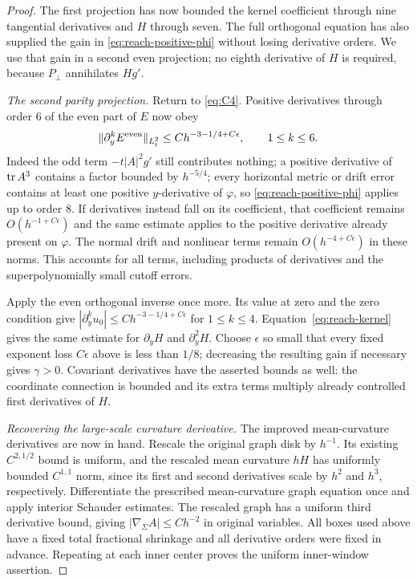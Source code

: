 \begin{proof}
The first projection has now bounded the kernel coefficient through
nine tangential derivatives and $H$ through seven.  The full orthogonal
equation has also supplied the gain in \eqref{eq:reach-positive-phi}
without losing derivative orders.  We use that gain in a second even
projection; no eighth derivative of $H$ is required, because $P_\perp$
annihilates $Hg'$.

\emph{The second parity projection.}
Return to \eqref{eq:C4}.  Positive derivatives through order 6 of
the even part of $E$ now obey
\begin{equation}\label{eq:reach-second-parity}
 \|\partial_y^kE^{\rm even}\|_{L_t^2}
 \le C h^{-3-1/4+C\epsilon},\qquad1\le k\le6.
\end{equation}
Indeed the odd term $-t|A|^2g'$ still contributes nothing; a positive
derivative of $\operatorname{tr} A^3$ contains a factor bounded by $h^{-5/4}$;
every horizontal metric or drift error contains at least one positive
$y$-derivative of $\varphi$, so \eqref{eq:reach-positive-phi} applies
up to order 8.  If derivatives instead fall on its coefficient, that
coefficient remains $O(h^{-1+C\epsilon})$ and the same estimate
applies to the positive derivative already present on $\varphi$.
The normal drift and nonlinear terms remain $O(h^{-4+C\epsilon})$
in these norms.  This accounts for all terms, including products of
derivatives and the superpolynomially small cutoff errors.

Apply the even orthogonal inverse once more.  Its value at zero and
the zero condition give
$|\partial_y^ku_0|\le C h^{-3-1/4+C\epsilon}$ for $1\le k\le4$.
Equation~\eqref{eq:reach-kernel} gives the same estimate for
$\partial_yH$ and $\partial_y^2H$.  Choose $\epsilon$ so small that
every fixed exponent loss $C\epsilon$ above is less than $1/8$;
decreasing the resulting gain if necessary gives $\gamma>0$.
Covariant derivatives have the asserted bounds as well: the coordinate
connection is bounded and its extra terms multiply already controlled
first derivatives of $H$.

\emph{Recovering the large-scale curvature derivative.}
The improved mean-curvature derivatives are now in hand.  Rescale
the original graph disk by $h^{-1}$.  Its existing
$C^{2,1/2}$ bound is uniform, and the rescaled mean curvature $hH$
has uniformly bounded $C^{1,1}$ norm, since its first and second
derivatives scale by $h^2$ and $h^3$, respectively.  Differentiate
the prescribed mean-curvature graph equation once and apply interior
Schauder estimates.  The rescaled graph has a uniform third derivative
bound, giving $|\nabla_\Sigma A|\le Ch^{-2}$ in original variables.
All boxes used above have a fixed total fractional shrinkage and all
derivative orders were fixed in advance.  Repeating at each inner
center proves the uniform inner-window assertion.
\end{proof}
